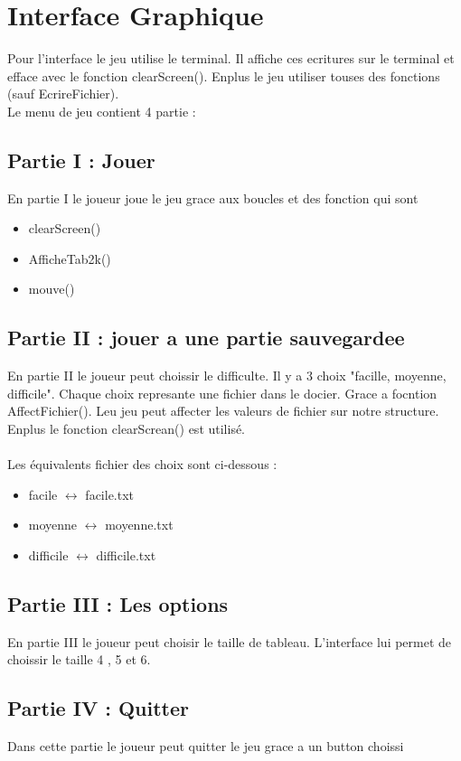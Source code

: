 \documentclass{article}
\begin{document}
\section{Interface Graphique}
Pour l'interface le jeu utilise le terminal. Il affiche ces ecritures sur le terminal et efface avec le fonction clearScreen(). Enplus le jeu utiliser touses des fonctions (sauf EcrireFichier).
\\
Le menu de jeu contient 4 partie :

\subsection{Partie I : Jouer}
En partie I le joueur joue le jeu grace aux boucles et des fonction qui sont 

\begin{itemize}
	\item clearScreen()
	\item AfficheTab2k()
	\item mouve()
\end{itemize}


\subsection{Partie II : jouer a une partie sauvegardee}
En partie II le joueur peut choissir le difficulte.
Il y a 3 choix "facille, moyenne, difficile".
Chaque choix represante une fichier dans le docier.
Grace a focntion AffectFichier(). Leu jeu peut affecter les valeurs de fichier sur notre structure.
Enplus le fonction clearScrean() est utilisé.
\\ \\
Les équivalents fichier des choix sont ci-dessous : 

\begin{itemize}
	\item facile $\leftrightarrow$ facile.txt
	\item moyenne $\leftrightarrow$ moyenne.txt
	\item difficile $\leftrightarrow$ difficile.txt
\end{itemize}


\subsection{Partie III : Les options}
En partie III le joueur peut choisir le taille de tableau. L'interface lui permet de choissir le taille 4 , 5 et 6.

\subsection{Partie IV : Quitter}
Dans cette partie le joueur peut quitter le jeu grace a un button choissi
\end{document}
